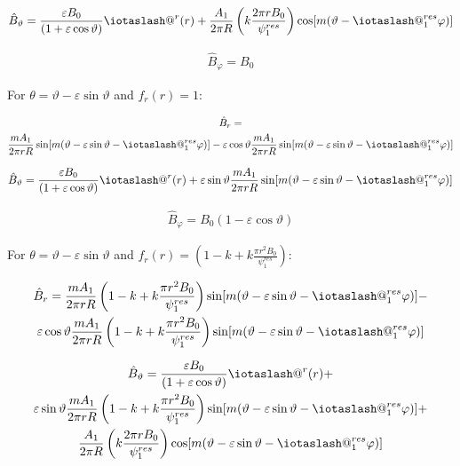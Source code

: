\documentclass[11pt,a4paper,oneside]{article}
\makeatletter
\newcommand{\iotaslash}{{\mathpalette\iotaslash@\relax}}
\newcommand{\iotaslash@}[2]{
  \raisebox{-0.6\height}[0pt][0pt]{%
    \rotatebox[origin=Bl]{15}{$\m@th#1{\mkern-1mu\mathchar'26}$}%
  }%
  \mkern-9.5mu\nonscript\mkern-1mu
  \iota
  \mkern1mu
}
\makeatother
\begin{document}
\begin{align}
\hat{B}_{\vartheta}=
\frac{\varepsilon B_0}{(1+\varepsilon \cos{\vartheta})}\iotaslash^r(r)+
\frac{A_1}{2\pi R}\left(k\frac{2\pi r B_0}{\psi^{res}_1}\right)\cos[m(\vartheta-\iotaslash^{res}_1\varphi)]
\end{align}

\begin{align}
\hat{B}_{\varphi}=B_0 
\end{align}

For $\theta = \vartheta-\varepsilon \sin{\vartheta}$ and $f_r(r)=1$:

\begin{multline}
\hat{B}_{r}=\\
\frac{mA_1}{2\pi rR}\sin[m(\vartheta-\varepsilon \sin{\vartheta}-\iotaslash^{res}_1\varphi)]-\varepsilon\cos{\vartheta}\frac{mA_1}{2\pi rR}\sin[m(\vartheta-\varepsilon \sin{\vartheta}-\iotaslash^{res}_1\varphi)]
\end{multline}

\begin{align}
\hat{B}_{\vartheta}=
\frac{\varepsilon B_0}{(1+\varepsilon \cos{\vartheta})}\iotaslash^r(r)+\varepsilon \sin{\vartheta}\frac{mA_1}{2\pi rR}\sin[m(\vartheta-\varepsilon \sin{\vartheta}-\iotaslash^{res}_1\varphi)]
\end{align}

\begin{align}
\hat{B}_{\varphi}=B_0 (1-\varepsilon \cos{\vartheta})
\end{align}

For $\theta = \vartheta-\varepsilon \sin{\vartheta}$ and $f_r(r)=\left(1-k+k\frac{\pi r^2 B_0}{\psi^{res}_1}\right)$:

\begin{multline}
\hat{B}_{r}=
\frac{mA_1}{2\pi rR}\left(1-k+k\frac{\pi r^2 B_0}{\psi^{res}_1}\right)\sin[m(\vartheta-\varepsilon \sin{\vartheta}-\iotaslash^{res}_1\varphi)]-\\
\varepsilon\cos{\vartheta}\frac{mA_1}{2\pi rR}\left(1-k+k\frac{\pi r^2 B_0}{\psi^{res}_1}\right)\sin[m(\vartheta-\varepsilon \sin{\vartheta}-\iotaslash^{res}_1\varphi)]
\end{multline}

\begin{multline}
\hat{B}_{\vartheta}=
\frac{\varepsilon B_0}{(1+\varepsilon \cos{\vartheta})}\iotaslash^r(r)+\\
\varepsilon \sin{\vartheta}\frac{mA_1}{2\pi rR}\left(1-k+k\frac{\pi r^2 B_0}{\psi^{res}_1}\right)\sin[m(\vartheta-\varepsilon \sin{\vartheta}-\iotaslash^{res}_1\varphi)]+\\
\frac{A_1}{2\pi R}\left(k\frac{2\pi r B_0}{\psi^{res}_1}\right)\cos[m(\vartheta-\varepsilon \sin{\vartheta}-\iotaslash^{res}_1\varphi)]
\end{multline}
\end{document}
